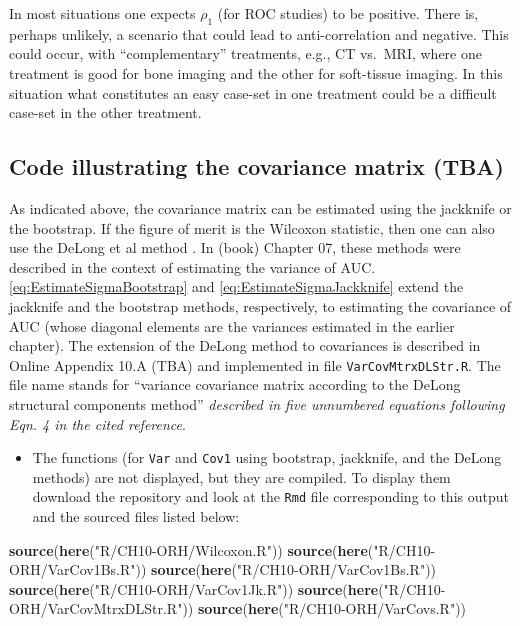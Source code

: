 \documentclass[
]{book}
\newenvironment{Shaded}{\begin{snugshade}}{\end{snugshade}}
\newcommand{\KeywordTok}[1]{\textcolor[rgb]{0.13,0.29,0.53}{\textbf{#1}}}
\newcommand{\NormalTok}[1]{#1}
\newcommand{\StringTok}[1]{\textcolor[rgb]{0.31,0.60,0.02}{#1}}
\providecommand{\tightlist}{%
  \setlength{\itemsep}{0pt}\setlength{\parskip}{0pt}}
\begin{document}
In most situations one expects \(\rho_1\) (for ROC studies) to be positive. There is, perhaps unlikely, a scenario that could lead to anti-correlation and negative. This could occur, with ``complementary'' treatments, e.g., CT vs.~MRI, where one treatment is good for bone imaging and the other for soft-tissue imaging. In this situation what constitutes an easy case-set in one treatment could be a difficult case-set in the other treatment.

\hypertarget{code-illustrating-the-covariance-matrix-tba}{%
\subsection{Code illustrating the covariance matrix (TBA)}\label{code-illustrating-the-covariance-matrix-tba}}

As indicated above, the covariance matrix can be estimated using the jackknife or the bootstrap. If the figure of merit is the Wilcoxon statistic, then one can also use the DeLong et al method \citep{RN112}. In (book) Chapter 07, these methods were described in the context of estimating the variance of AUC. \eqref{eq:EstimateSigmaBootstrap} and \eqref{eq:EstimateSigmaJackknife} extend the jackknife and the bootstrap methods, respectively, to estimating the covariance of AUC (whose diagonal elements are the variances estimated in the earlier chapter). The extension of the DeLong method to covariances is described in Online Appendix 10.A (TBA) and implemented in file \texttt{VarCovMtrxDLStr.R}. The file name stands for ``variance covariance matrix according to the DeLong structural components method'' \emph{described in five unnumbered equations following Eqn. 4 in the cited reference}.

\begin{itemize}
\tightlist
\item
  The functions (for \texttt{Var} and \texttt{Cov1} using bootstrap, jackknife, and the DeLong methods) are not displayed, but they are compiled. To display them download the repository and look at the \texttt{Rmd} file corresponding to this output and the sourced files listed below:
\end{itemize}

\begin{Shaded}
\begin{Highlighting}[]
\KeywordTok{source}\NormalTok{(}\KeywordTok{here}\NormalTok{(}\StringTok{"R/CH10{-}ORH/Wilcoxon.R"}\NormalTok{))}
\KeywordTok{source}\NormalTok{(}\KeywordTok{here}\NormalTok{(}\StringTok{"R/CH10{-}ORH/VarCov1Bs.R"}\NormalTok{))}
\KeywordTok{source}\NormalTok{(}\KeywordTok{here}\NormalTok{(}\StringTok{"R/CH10{-}ORH/VarCov1Bs.R"}\NormalTok{))}
\KeywordTok{source}\NormalTok{(}\KeywordTok{here}\NormalTok{(}\StringTok{"R/CH10{-}ORH/VarCov1Jk.R"}\NormalTok{)) }
\KeywordTok{source}\NormalTok{(}\KeywordTok{here}\NormalTok{(}\StringTok{"R/CH10{-}ORH/VarCovMtrxDLStr.R"}\NormalTok{))}
\KeywordTok{source}\NormalTok{(}\KeywordTok{here}\NormalTok{(}\StringTok{"R/CH10{-}ORH/VarCovs.R"}\NormalTok{))}
\end{Highlighting}
\end{Shaded}
\end{document}
